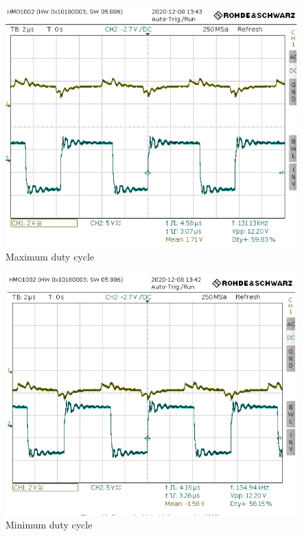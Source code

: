 \begin{figure}
	\centering
	\includegraphics[width=\linewidth]{"img/test Vo Vg max"}
	\caption{Maximum duty cycle}
	\label{fig:test-vo-vg-max}
\end{figure}

\begin{figure}
	\centering
	\includegraphics[width=\linewidth]{"img/test Vo Vg min"}
	\caption{Minimum duty cycle}
	\label{fig:test-vo-vg-min}
\end{figure}

